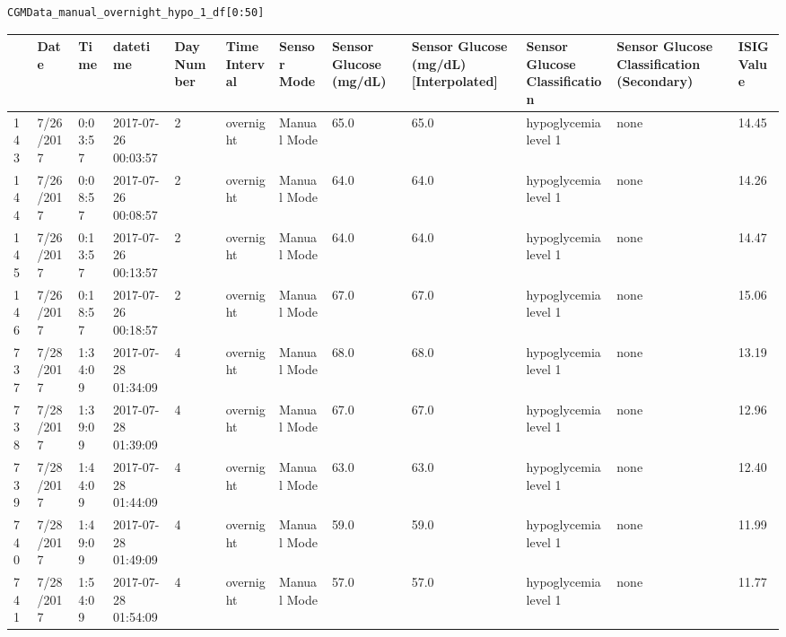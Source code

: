 \bigskip

\begin{verbatim}
CGMData_manual_overnight_hypo_1_df[0:50]
\end{verbatim}

\bigskip\noindent
\begin{tabular}{p{}p{}p{}p{}p{}p{}p{}p{}p{}p{}p{}p{}}
\toprule
 & Date & Time & datetime & Day Number & Time Interval & Sensor Mode & Sensor Glucose (mg/dL) & Sensor Glucose (mg/dL) [Interpolated] & Sensor Glucose Classification & Sensor Glucose Classification (Secondary) & ISIG Value \\
\hline
143 & 7/26/2017 & 0:03:57 & 2017-07-26 00:03:57 & 2 & overnight & Manual Mode & 65.0 & 65.0 & hypoglycemia level 1 & none & 14.45 \\
\hline
144 & 7/26/2017 & 0:08:57 & 2017-07-26 00:08:57 & 2 & overnight & Manual Mode & 64.0 & 64.0 & hypoglycemia level 1 & none & 14.26 \\
\hline
145 & 7/26/2017 & 0:13:57 & 2017-07-26 00:13:57 & 2 & overnight & Manual Mode & 64.0 & 64.0 & hypoglycemia level 1 & none & 14.47 \\
\hline
146 & 7/26/2017 & 0:18:57 & 2017-07-26 00:18:57 & 2 & overnight & Manual Mode & 67.0 & 67.0 & hypoglycemia level 1 & none & 15.06 \\
\hline
737 & 7/28/2017 & 1:34:09 & 2017-07-28 01:34:09 & 4 & overnight & Manual Mode & 68.0 & 68.0 & hypoglycemia level 1 & none & 13.19 \\
\hline
738 & 7/28/2017 & 1:39:09 & 2017-07-28 01:39:09 & 4 & overnight & Manual Mode & 67.0 & 67.0 & hypoglycemia level 1 & none & 12.96 \\
\hline
739 & 7/28/2017 & 1:44:09 & 2017-07-28 01:44:09 & 4 & overnight & Manual Mode & 63.0 & 63.0 & hypoglycemia level 1 & none & 12.40 \\
\hline
740 & 7/28/2017 & 1:49:09 & 2017-07-28 01:49:09 & 4 & overnight & Manual Mode & 59.0 & 59.0 & hypoglycemia level 1 & none & 11.99 \\
\hline
741 & 7/28/2017 & 1:54:09 & 2017-07-28 01:54:09 & 4 & overnight & Manual Mode & 57.0 & 57.0 & hypoglycemia level 1 & none & 11.77 \\

\end{tabular}
